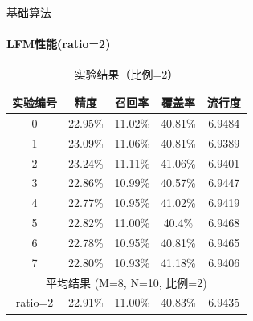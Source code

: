 \documentclass{beamer}
\begin{document}
	\begin{frame}{基础算法}
	\framesubtitle{LFM性能(ratio=2)}
		\begin{table}[h]
		\centering
		\caption{实验结果（比例=2）}
			\begin{tabular}{|c|c|c|c|c|}
			\hline
			实验编号 & 精度 & 召回率 & 覆盖率 & 流行度 \\
			\hline
			0 & 22.95\% & 11.02\% & 40.81\% & 6.9484 \\
			1 & 23.09\% & 11.06\% & 40.81\% & 6.9389 \\
			2 & 23.24\% & 11.11\% & 41.06\% & 6.9401 \\
			3 & 22.86\% & 10.99\% & 40.57\% & 6.9447 \\
			4 & 22.77\% & 10.95\% & 41.02\% & 6.9419 \\
			5 & 22.82\% & 11.00\% & 40.4\% & 6.9468 \\
			6 & 22.78\% & 10.95\% & 40.81\% & 6.9465 \\
			7 & 22.80\% & 10.93\% & 41.18\% & 6.9406 \\
			\hline
			\multicolumn{5}{c}{平均结果 (M=8, N=10, 比例=2)} \\
			\hline
 			ratio=2 & 22.91\% & 11.00\% & 40.83\% & 6.9435 \\
			\hline
			\end{tabular}
		\end{table}
	\end{frame}
\end{document}
